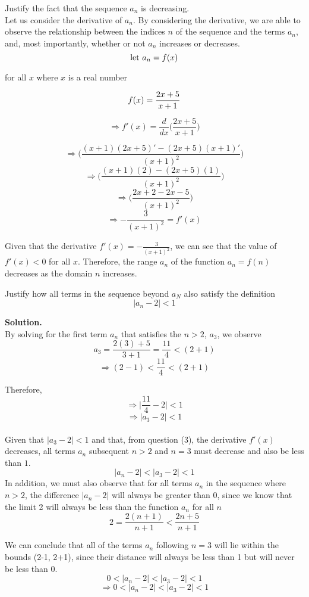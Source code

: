 \documentclass{article}
\newenvironment{problem}[2][Problem]{\begin{trivlist}
\item[\hskip \labelsep {\bfseries #1}\hskip \labelsep {\bfseries #2.}]}{\end{trivlist}}
\begin{document}
\begin{problem}{1.3}
  Justify the fact that the sequence $ a_{n} $ is decreasing. \\

    Let us consider the derivative of $ a_{n} $. By considering
    the derivative, we are able to observe the relationship
    between the indices $ n $ of the sequence and the terms $ a_{n} $, and, most importantly,
    whether or not $ a_{n} $ increases or decreases.
    \[ \textrm{let $ a_{n} = f(x)$}\]
    \begin{center}
      for all $ x $ where $ x $ is a real number
    \end{center}

    \[ \textrm{$ f(x) $} = \frac{2x+5}{x+1} \]

    \[ \Rightarrow f'(x) = \frac{d}{dx} \Biggr(\frac{2x+5}{x+1} \Biggr)\]

    \[ \Rightarrow \Biggr( \frac{(x+1)(2x+5)' - (2x+5)(x+1)'}{(x+1)^{2}} \Biggr)\]
    \[ \Rightarrow \Biggr( \frac{(x+1)(2) - (2x+5)(1)}{(x+1)^{2}}\Biggr)\]
    \[ \Rightarrow \Biggr( \frac{2x+2 - 2x - 5}{(x+1)^{2}}\Biggr)\]
    \[ \Rightarrow -\frac{3}{(x+1)^{2}} = f'(x) \]

    Given that the derivative $ f'(x) = -\frac{3}{(x+1)^{2}}$,
    we can see that the value of $ f'(x) < 0 $ for all $ x $.
    Therefore, the range $ a_{n} $ of the function $ a_{n} = f(n) $ decreases as
    the domain $ n$ increases.

\end{problem}
\begin{problem}{1.4}
  Justify how all terms in the sequence beyond $ a_{N} $
  also satisfy the definition
  \[ |a_{n} - 2| < 1 \]

  \textbf{Solution.}
  \\
  By solving for the first term $ a_{n}$ that satisfies
  the  $ n > 2 $, $ a_{3} $,  we observe
  \[ a_{3} = \frac{2(3)+5}{3+1} = \frac{11}{4} < (2+1) \]
  \[ \Rightarrow (2-1) < \frac{11}{4} < (2+1) \]

  Therefore,
  \[ \Rightarrow \Biggr|\frac{11}{4} - 2\Biggr| < 1 \]
  \[ \Rightarrow  |a_{3} - 2| < 1 \]
  \\
  Given that $ |a_{3} - 2| < 1 $ and that, from question (3),  the derivative  $ f'(x)$ decreases, all terms $a_{n}$ subsequent  $n > 2 $ and $ n = 3 $ must decrease and also be less than $ 1$.
  \[ |a_{n} - 2| < |a_{3} - 2| < 1 \]
  In addition, we must also observe that for all terms $ a_{n} $ in the sequence  where $ n > 2 $,  the difference $ |a_{n}-2| $ will always
  be greater than 0, since we know that the limit 2 will always
  be less than the function $ a_{n} $ for all $ n$
  \[ 2 = \frac{2(n+1)}{n+1} < \frac{2n+5}{n+1}\]

  We can
  conclude that all of the terms $a_{n}$ following $ n = 3 $ will
  lie  within the bounds (2-1, 2+1), since their distance
  will always be less than 1 but will never be less than 0.
  \[ 0 < |a_{n} - 2| < |a_{3} - 2| < 1 \]
  \[ \Rightarrow 0 < |a_{n} - 2| < |a_{3} - 2| < 1 \]
\end{problem}
\end{document}
